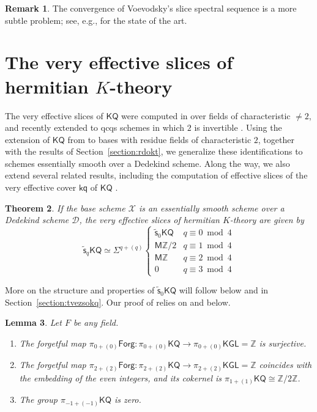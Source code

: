 \documentclass[11pt,hyp,english]{article}
\newcommand{\Z}{\mathbb{Z}}
\newcommand{\KGL}{\mathsf{KGL}}
\newcommand{\KQ}{\mathsf{KQ}}
\newcommand{\kq}{\mathsf{kq}}
\newcommand{\HZ}{\mathsf{M}\Z}
\newcommand{\vs}{\tilde{\mathsf{s}}}
\newcommand{\Forg}{\mathsf{Forg}}
\newtheorem{theorem}{Theorem}[section]
\newtheorem{lemma}[theorem]{Lemma}
\theoremstyle{definition}
\newtheorem{remark}[theorem]{Remark}
\begin{document}
\begin{remark}
The convergence of Voevodsky's slice spectral sequence is a more subtle problem;
see, e.g., 
\cite{BEO,zbMATH06220359,zbMATH07003144,zbMATH02078162} for the state of the art.
\end{remark}






\section{The very effective slices of hermitian $K$-theory}
\label{tvesohkt}
The very effective slices of $\KQ$ were computed in \cite[Theorem 16]{Bachmann} 
over fields of characteristic $\neq 2$, 
and recently extended to qcqs schemes in which $2$ is invertible 
\cite[Theorem 10.22]{bem.kglslices}. 
Using the extension of $\KQ$ from \cite{chn} to bases with residue fields of characteristic $2$, together with the results of Section~\ref{section:rdokt}, we generalize these identifications to schemes essentially smooth over a Dedekind scheme. Along the way, we also extend several related results, including the computation of effective slices of the very effective cover $\kq$ of $\KQ$ \cite{aro}.

\begin{theorem}
\label{BachmannKQ}
\label{thm:veff-KQ}
If the base scheme $\mathcal{X}$ is an essentially smooth scheme over a Dedekind scheme $\mathcal{D}$, 
the very effective slices of hermitian $K$-theory are given by 
\[
\vs_{q}\KQ
\simeq
\Sigma^{q+(q)}\begin{cases}
\vs_0\KQ & q \equiv 0 \bmod 4 \\
\HZ/2 & q \equiv 1 \bmod 4 \\
\HZ & q \equiv 2 \bmod 4 \\
0 & q \equiv 3 \bmod 4
\end{cases}
\]
\end{theorem}

More on the structure and properties of $\vs_0\KQ$ will follow below and in 
Section~\ref{section:tvezsokq}.
Our proof of  relies on  and 
 below.


\begin{lemma}\label{lem:low-degree-homotopy-sheaves-KQ}
Let $F$ be any field. 
\begin{enumerate}
    \item The forgetful map $\pi_{0+(0)}\Forg\colon \pi_{0+(0)}\KQ\to \pi_{0+(0)}\KGL = \Z$ is surjective.
    \item The forgetful map $\pi_{2+(2)}\Forg\colon \pi_{2+(2)}\KQ \to \pi_{2+(2)}\KGL=\Z$ coincides with the embedding of the even integers, and its cokernel is $\pi_{1+(1)}\KQ\cong \Z/2\Z$.
    \item The group $\pi_{-1+(-1)}\KQ$ is zero.
\end{enumerate}
\end{lemma}
\end{document}
